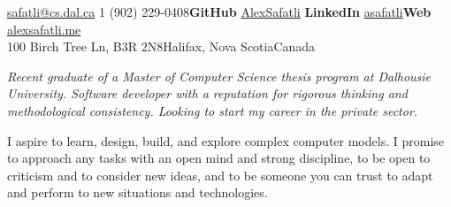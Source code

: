 \documentclass[10pt,a4paper]{article}
\begin{document}
 

\noindent\href{mailto:safatli@cs.dal.ca}{safatli@cs.dal.ca}\bull
\textsmaller{+}1 (902) 229-0408\bull \textbf{GitHub} \href{https://github.com/AlexSafatli/}{AlexSafatli}\bull
\textbf{LinkedIn} \href{http://ca.linkedin.com/in/asafatli}{asafatli}\bull \textbf{Web} \href{http://alexsafatli.me}{alexsafatli.me}\\
100 Birch Tree Ln, B3R 2N8\bull Halifax, Nova Scotia\bull Canada
\spacedhrule{0.9em}{-0.4em} %

\vspace{-1.3em}
\begin{multicols}{2}
\noindent \textit{Recent graduate of a Master of Computer Science thesis program at Dalhousie University. Software developer with a reputation for rigorous thinking and methodological consistency. Looking to start my career in the private sector.}

I aspire to learn, design, build, and explore complex computer models. I promise to approach any tasks with an open mind and strong discipline, to be open to criticism and to consider new ideas, and to be someone you can trust to adapt and perform to new situations and technologies.
\end{multicols}

\spacedhrule{0.5em}{-0.4em} %


\end{document}
